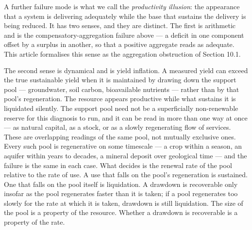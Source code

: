 \documentclass[11pt]{article}
\begin{document}
A further failure mode is what we call the \emph{productivity illusion}:
the appearance that a system is delivering adequately while the base
that sustains the delivery is being reduced. It has two senses, and they
are distinct. The first is arithmetic and is the
compensatory-aggregation failure above --- a deficit in one component
offset by a surplus in another, so that a positive aggregate reads as
adequate. This article formalises this sense as the aggregation
obstruction of Section 10.1.

The second sense is dynamical and is yield inflation. A measured yield
can exceed the true sustainable yield when it is maintained by drawing
down the support pool --- groundwater, soil carbon, bioavailable
nutrients --- rather than by that pool's regeneration. The resource
appears productive while what sustains it is liquidated silently. The
support pool need not be a superficially non-renewable reserve for this
diagnosis to run, and it can be read in more than one way at once --- as
natural capital, as a stock, or as a slowly regenerating flow of
services. These are overlapping readings of the same pool, not mutually
exclusive ones. Every such pool is regenerative on some timescale --- a
crop within a season, an aquifer within years to decades, a mineral
deposit over geological time --- and the failure is the same in each
case. What decides is the renewal rate of the pool relative to the rate
of use. A use that falls on the pool's regeneration is sustained. One
that falls on the pool itself is liquidation. A drawdown is recoverable
only insofar as the pool regenerates faster than it is taken; if a pool
regenerates too slowly for the rate at which it is taken, drawdown is
still liquidation. The size of the pool is a property of the resource.
Whether a drawdown is recoverable is a property of the rate.
\end{document}
